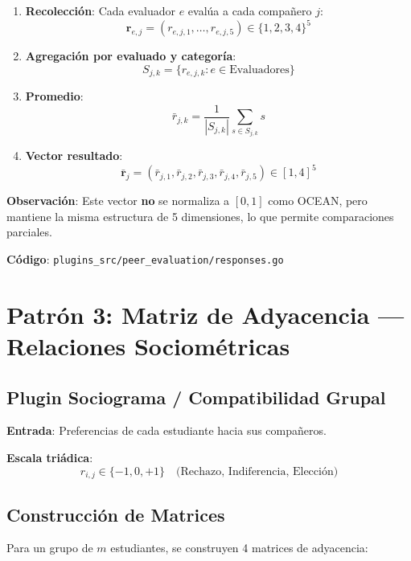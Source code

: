 \documentclass[12pt,a4paper]{article}
\begin{document}
\begin{enumerate}
    \item \textbf{Recolección}: Cada evaluador $e$ evalúa a cada compañero $j$:
    \[
    \mathbf{r}_{e,j} = (r_{e,j,1}, \ldots, r_{e,j,5}) \in \{1, 2, 3, 4\}^5
    \]
    
    \item \textbf{Agregación por evaluado y categoría}:
    \[
    S_{j,k} = \{r_{e,j,k} : e \in \text{Evaluadores}\}
    \]
    
    \item \textbf{Promedio}:
    \[
    \bar{r}_{j,k} = \frac{1}{|S_{j,k}|} \sum_{s \in S_{j,k}} s
    \]
    
    \item \textbf{Vector resultado}:
    \[
    \mathbf{\bar{r}}_j = (\bar{r}_{j,1}, \bar{r}_{j,2}, \bar{r}_{j,3}, \bar{r}_{j,4}, \bar{r}_{j,5}) \in [1, 4]^5
    \]
\end{enumerate}

\textbf{Observación}: Este vector \textbf{no} se normaliza a $[0,1]$ como OCEAN, pero mantiene la misma estructura de 5 dimensiones, lo que permite comparaciones parciales.

\textbf{Código}: \texttt{plugins\_src/peer\_evaluation/responses.go}

\section{Patrón 3: Matriz de Adyacencia --- Relaciones Sociométricas}
\label{sec:adjacency}

\subsection{Plugin Sociograma / Compatibilidad Grupal}

\textbf{Entrada}: Preferencias de cada estudiante hacia sus compañeros.

\textbf{Escala triádica}:
\[
r_{i,j} \in \{-1, 0, +1\} \quad \text{(Rechazo, Indiferencia, Elección)}
\]

\subsection{Construcción de Matrices}

Para un grupo de $m$ estudiantes, se construyen 4 matrices de adyacencia:
\end{document}
